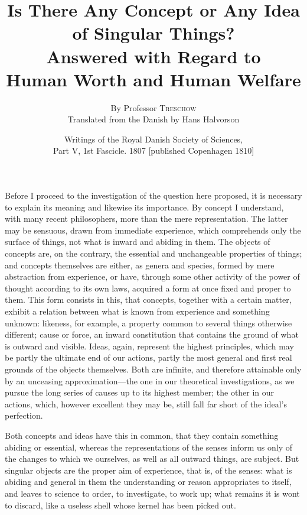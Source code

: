 \documentclass[12pt,a4paper]{article}
\title{\textbf{Is There Any Concept or Any Idea\\ of Singular Things?}\\[6pt]
       \large Answered with Regard to\\[4pt]
       \large Human Worth and Human Welfare}
\author{By Professor \textsc{Treschow}\\[4pt]
  \small Translated from the Danish by Hans Halvorson}
\date{\small Writings of the Royal Danish Society of Sciences,\\
      Part V, 1st Fascicle. 1807 [published Copenhagen 1810]}
\begin{document}
\maketitle
\thispagestyle{fancy}

\bigskip


\noindent
Before I proceed to the investigation of the question here proposed, it is
necessary to explain its meaning and likewise its importance. By concept
I understand, with many recent philosophers, more than the mere representation.
The latter may be sensuous, drawn from immediate experience, which comprehends
only the surface of things, not what is inward and abiding in them. The objects
of concepts are, on the contrary, the essential and unchangeable properties of
things; and concepts themselves are either, as genera and species, formed by
mere abstraction from experience, or have, through some other activity of the
power of thought according to its own laws, acquired a form at once fixed and
proper to them. This form consists in this, that concepts, together with a
certain matter, exhibit a relation between what is known from experience and
something unknown: likeness, for example, a property common to several things
otherwise different; cause or force, an inward constitution that contains the
ground
of what is outward and visible. Ideas, again, represent the highest principles,
which may be partly the ultimate end of our actions, partly the most general
and first real grounds of the objects themselves. Both are infinite, and
therefore attainable only by an unceasing approximation---the one in our
theoretical investigations, as we pursue the long series of causes up to its
highest member; the other in our actions, which, however excellent they may be,
still fall far short of the ideal's perfection.

Both concepts and ideas have this in common, that they contain something
abiding or essential, whereas the representations of the senses inform us only
of the changes to which we ourselves, as well as all outward things, are
subject. But singular objects are the proper aim of experience, that is, of the
senses: what is abiding and general in them the understanding or reason
appropriates to itself, and leaves to science to order, to investigate, to work
up; what remains it is wont to discard, like a useless shell whose kernel has
been picked out.
\end{document}
